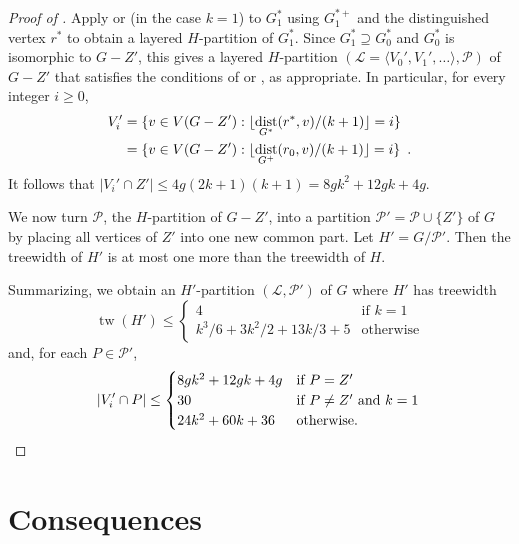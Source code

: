 \documentclass{patmorin}
\DeclareMathOperator{\dist}{dist}
\DeclareMathOperator{\tw}{tw}
\begin{document}
\begin{proof}[Proof of ]
  Apply  or (in the case $k=1$)  to $G^*_1$ using $G^{*+}_1$ and the distinguished vertex $r^*$ to obtain a layered $H$-partition of $G^*_1$.  Since $G^*_1\supseteq G^*_0$ and $G^*_0$ is isomorphic to $G-Z'$, this gives a layered $H$-partition $(\mathcal{L}=\langle V_0',V_1',\ldots\rangle,\mathcal{P})$ of $G-Z'$ that satisfies the conditions of  or , as appropriate.  In particular, for every integer $i\ge 0$,
  \begin{align*} 
    V_i'& = \{v\in V(G-Z'):\floor{\dist_{G^*}(r^*,v)/(k+1)} = i\} \\
        & = \{v\in V(G-Z'):\floor{\dist_{G^+}(r_0,v)/(k+1)} = i\} \enspace .
  \end{align*}
  It follows that $|V_i'\cap Z'|\le 4g(2k+1)(k+1) = 8gk^2+12gk+4g$.  
  
  We now turn $\mathcal{P}$, the $H$-partition of $G-Z'$, into a partition $\mathcal{P}'=\mathcal{P}\cup \{Z'\}$ of $G$ by placing all vertices of $Z'$ into one new common part.  Let $H'=G/ \mathcal{P}'$.  Then the treewidth of $H'$ is at most one more than the treewidth of $H$.
  
   
  Summarizing, we obtain an $H'$-partition $(\mathcal{L},\mathcal{P}')$ of $G$ where $H'$ has treewidth 
  \[
      \tw(H') 
        \le \begin{cases}
              4 & \text{if $k=1$} \\
              k^3/6 + 3k^2/2 + 13k/3+5 & \text{otherwise}
            \end{cases} 
  \]
  and, for each $P\in\mathcal{P}'$,
  \[ 
    |V_i' \cap P| \le \begin{cases} 8gk^2+12gk+4g & \text{if $P=Z'$} \\
                                    30 & \text{if $P\neq Z'$ and $k=1$} \\
                                    24k^2+60k+36 & \text{otherwise.} 
                      \end{cases} \qedhere
  \]
\end{proof}

\section{Consequences}
\end{document}
